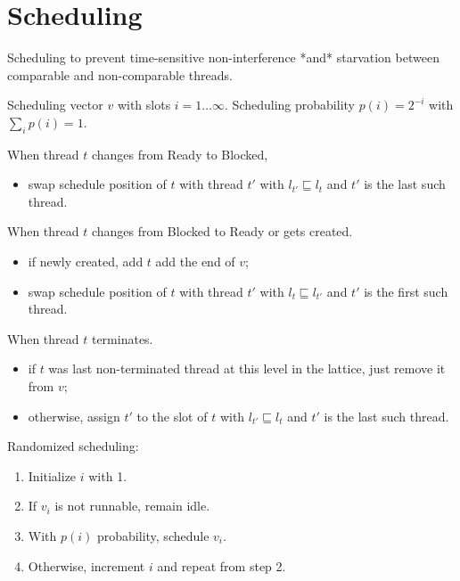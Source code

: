 \documentclass[10pt,preprint]{sigplanconf}
\begin{document}


\section{Scheduling}

Scheduling to prevent time-sensitive non-interference *and* starvation between comparable and non-comparable threads.

Scheduling vector $v$ with slots $i=1 \ldots \infty$.  Scheduling probability $p(i) = 2^{-i}$ with $\sum_i p(i) = 1$.

When thread $t$ changes from Ready to Blocked,

\begin{itemize}
  \item swap schedule position of $t$ with thread $t'$ with $l_{t'} \sqsubseteq l_t$ and $t'$ is the last such thread.
\end{itemize}

When thread $t$ changes from Blocked to Ready or gets created.

\begin{itemize}
  \item if newly created, add $t$ add the end of $v$;
  \item swap schedule position of $t$ with thread $t'$ with $l_{t} \sqsubseteq l_{t'}$ and $t'$ is the first such thread.
\end{itemize}

When thread $t$ terminates.

\begin{itemize}
  \item if $t$ was last non-terminated thread at this level in the lattice, just remove it from $v$;
  \item otherwise, assign $t'$ to the slot of $t$ with $l_{t'} \sqsubseteq l_t$ and $t'$ is the last such thread.
\end{itemize}

Randomized scheduling:

\begin{enumerate}
  \item Initialize $i$ with 1.
  \item If $v_i$ is not runnable, remain idle.
  \item With $p(i)$ probability, schedule $v_i$.
  \item Otherwise, increment $i$ and repeat from step 2.
\end{enumerate}
\end{document}
